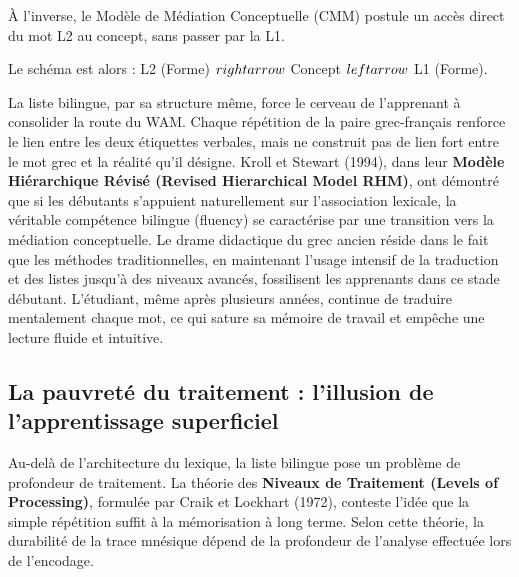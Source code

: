 À l'inverse, le Modèle de Médiation Conceptuelle (CMM) postule un accès direct du mot L2 au concept,
sans passer par la L1.

Le schéma est alors : L2 (Forme) $\\rightarrow$ Concept $\\leftarrow$ L1 (Forme).

La liste bilingue, par sa structure même, force le cerveau de l'apprenant à consolider la route du
WAM. Chaque répétition de la paire \og grec-français\fg{} renforce le lien entre les deux étiquettes
verbales, mais ne construit pas de lien fort entre le mot grec et la réalité qu'il désigne. Kroll et
Stewart (1994), dans leur \textbf{Modèle Hiérarchique Révisé (Revised Hierarchical Model \- RHM)},
ont démontré que si les débutants s'appuient naturellement sur l'association lexicale, la véritable
compétence bilingue (fluency) se caractérise par une transition vers la médiation
conceptuelle.\cite{III-1-3-ref4} Le drame didactique du grec ancien réside dans le fait que les
méthodes traditionnelles, en maintenant l'usage intensif de la traduction et des listes jusqu'à des
niveaux avancés, \og fossilisent\fg{} les apprenants dans ce stade débutant. L'étudiant, même après
plusieurs années, continue de traduire mentalement chaque mot, ce qui sature sa mémoire de travail
et empêche une lecture fluide et intuitive.



\subsection{La pauvreté du traitement : l'illusion de l'apprentissage superficiel}

Au-delà de l'architecture du lexique, la liste bilingue pose un problème de \og profondeur\fg{} de
traitement. La théorie des \textbf{Niveaux de Traitement (Levels of Processing)}, formulée par Craik
et Lockhart (1972), conteste l'idée que la simple répétition suffit à la mémorisation à long terme.
Selon cette théorie, la durabilité de la trace mnésique dépend de la profondeur de l'analyse
effectuée lors de l'encodage.\cite{III-1-3-ref7}

